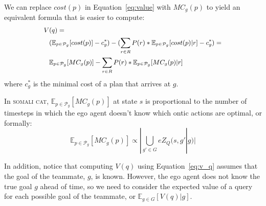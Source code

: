 \documentclass[letterpaper]{article}
\newtheorem{definition}{Definition}
\begin{document}
\noindent We can replace $cost(p)$ in Equation~\ref{eq:value} with $MC_g(p)$ to yield an equivalent formula that is easier to compute:
\begin{equation}
\small
\begin{split}
    V & (q) = \\ 
    & (\mathbb{E}_{p\in \mathcal{P}_g}[cost(p)] - c^*_g) - (\sum\limits_{r\in R}P(r)*\mathbb{E}_{p\in \mathcal{P}_g}[cost(p) | r] - c^*_g) =\\ &
    \mathbb{E}_{p\in \mathcal{P}_g}[MC_g(p)] - \sum\limits_{r\in R}P(r)*\mathbb{E}_{p\in \mathcal{P}_g}[MC_g(p) | r]
    \end{split}
    \label{eq:v_q}
\end{equation}
where $c^*_g$ is the minimal cost of a plan that arrives at $g$.

In \textsc{somali cat},
$\mathbb{E}_{p\in\mathcal{P}_g}[MC_g(p)]$ at state $s$ is proportional to the number of timesteps in which the ego agent doesn't know which ontic actions are optimal, or formally:
\begin{equation*}
    \mathbb{E}_{p\in \mathcal{P}_g}[MC_g(p)]\propto |\bigcup\limits_{g'\in G}eZ_Q(s, g' | g)|
\end{equation*}

In addition, notice that computing $V(q)$ using Equation~\ref{eq:v_q} assumes that the goal of the teammate, $g$, is known. However, the ego agent does not know the true goal $g$ ahead of time, so we need to consider the expected value of a query for each possible goal of the teammate, or $\mathbb{E}_{g\in G}[V(q) | g]$.

\end{document}
